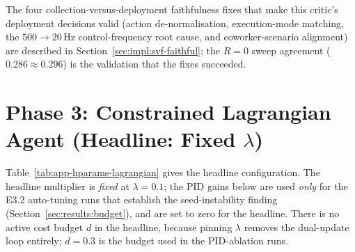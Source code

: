 \documentclass[11pt,a4paper]{report}
\begin{document}
The four collection-versus-deployment faithfulness fixes that make
this critic's deployment decisions valid (action de-normalisation,
execution-mode matching, the $500 \rightarrow 20$\,Hz control-frequency
root cause, and coworker-scenario alignment) are described in
Section~\ref{sec:impl:svf-faithful}; the $R = 0$ sweep agreement
($0.286 \approx 0.296$) is the validation that the fixes succeeded.

\section{Phase 3: Constrained Lagrangian Agent (Headline: Fixed $\lambda$)}
\label{app:hparams:lagrangian}

Table~\ref{tab:app-hparams-lagrangian} gives the headline
configuration. The headline multiplier is \emph{fixed} at
$\lambda = 0.1$; the PID gains below are used \emph{only} for the
E3.2 auto-tuning runs that establish the seed-instability finding
(Section~\ref{sec:results:budget}), and are set to zero for the
headline. There is no active cost budget $d$ in the headline, because
pinning $\lambda$ removes the dual-update loop entirely; $d = 0.3$ is
the budget used in the PID-ablation runs.
\end{document}
